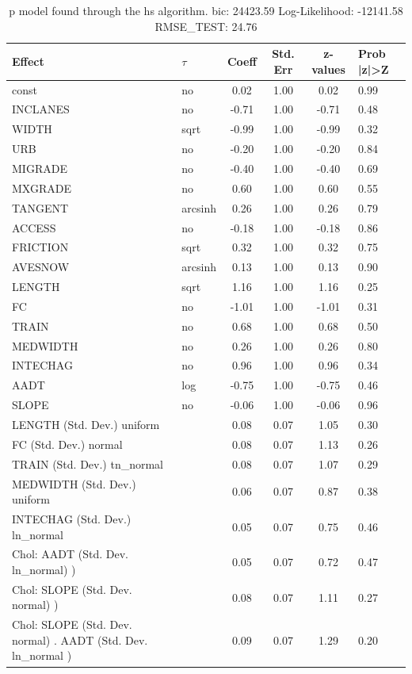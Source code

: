 \begin{table}
	\caption{p model found through the hs algorithm. bic: 24423.59 Log-Likelihood: -12141.58 RMSE_TEST: 24.76}
	\begin{center}
		\begin{tabular}{|l|l|c|c|c|l|}
			\hline
			Effect & $\tau$ & Coeff & Std. Err & z-values & Prob |z|>Z \\
			\hline
			const & no & 0.02 & 1.00 & 0.02 & 0.99 \\
			\hline
			INCLANES & no & -0.71 & 1.00 & -0.71 & 0.48 \\
			\hline
			WIDTH & sqrt & -0.99 & 1.00 & -0.99 & 0.32 \\
			\hline
			URB & no & -0.20 & 1.00 & -0.20 & 0.84 \\
			\hline
			MIGRADE & no & -0.40 & 1.00 & -0.40 & 0.69 \\
			\hline
			MXGRADE & no & 0.60 & 1.00 & 0.60 & 0.55 \\
			\hline
			TANGENT & arcsinh & 0.26 & 1.00 & 0.26 & 0.79 \\
			\hline
			ACCESS & no & -0.18 & 1.00 & -0.18 & 0.86 \\
			\hline
			FRICTION & sqrt & 0.32 & 1.00 & 0.32 & 0.75 \\
			\hline
			AVESNOW & arcsinh & 0.13 & 1.00 & 0.13 & 0.90 \\
			\hline
			LENGTH & sqrt & 1.16 & 1.00 & 1.16 & 0.25 \\
			\hline
			FC & no & -1.01 & 1.00 & -1.01 & 0.31 \\
			\hline
			TRAIN & no & 0.68 & 1.00 & 0.68 & 0.50 \\
			\hline
			MEDWIDTH & no & 0.26 & 1.00 & 0.26 & 0.80 \\
			\hline
			INTECHAG & no & 0.96 & 1.00 & 0.96 & 0.34 \\
			\hline
			AADT & log & -0.75 & 1.00 & -0.75 & 0.46 \\
			\hline
			SLOPE & no & -0.06 & 1.00 & -0.06 & 0.96 \\
			\hline
			LENGTH (Std. Dev.) uniform &  & 0.08 & 0.07 & 1.05 & 0.30 \\
			\hline
			FC (Std. Dev.) normal &  & 0.08 & 0.07 & 1.13 & 0.26 \\
			\hline
			TRAIN (Std. Dev.) tn_normal &  & 0.08 & 0.07 & 1.07 & 0.29 \\
			\hline
			MEDWIDTH (Std. Dev.) uniform &  & 0.06 & 0.07 & 0.87 & 0.38 \\
			\hline
			INTECHAG (Std. Dev.) ln_normal &  & 0.05 & 0.07 & 0.75 & 0.46 \\
			\hline
			 Chol: AADT (Std. Dev. ln_normal) ) &  & 0.05 & 0.07 & 0.72 & 0.47 \\
			\hline
			 Chol: SLOPE (Std. Dev. normal) ) &  & 0.08 & 0.07 & 1.11 & 0.27 \\
			\hline
			 Chol: SLOPE (Std. Dev. normal) . AADT (Std. Dev.   ln_normal ) &  & 0.09 & 0.07 & 1.29 & 0.20 \\
			\hline
		\end{tabular}
	\end{center}
\end{table}